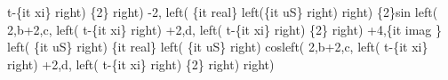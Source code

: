 \begin{maplegroup}
t-\{it xi\} right) \{2\} right) -2, left( \{it real\} left(\{it uS\} right)  right) \{2\}sin left( 2,b+2,c, left( t-\{it xi\} right) +2,d, left( t-\{it xi\} right) \{2\} right) +4,\{it imag
\} left( \{it uS\} right) \{it real\} left( \{it uS\} right) cosleft( 2,b+2,c, left( t-\{it xi\} right) +2,d, left( t-\{it xi\} right) \{2\} right)  right)\end{maplegroup}
